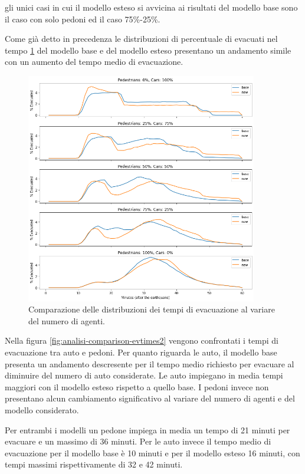 gli unici casi in cui il modello esteso si avvicina ai risultati del modello base sono il caso con solo pedoni ed il caso 75\%-25\%.

\pagebreak

Come già detto in precedenza le distribuzioni di percentuale di evacuati nel tempo \ref{fig:analisi-comparison-evtimes} del modello base e del modello esteso 
presentano un andamento simile con un aumento del tempo medio di evacuazione.

\begin{figure}[h]
    \centering
    \includegraphics[width=0.9\textwidth]{images/analisi/comparison-evtimes.png}
    \caption{Comparazione delle distribuzioni dei tempi di evacuazione al variare del numero di agenti.}
    \label{fig:analisi-comparison-evtimes}
\end{figure}


Nella figura \ref{fig:analisi-comparison-evtimes2} vengono confrontati i tempi di evacuazione tra auto e pedoni.
Per quanto riguarda le auto, il modello base presenta un andamento descresente per il tempo medio richiesto per evacuare al diminuire del numero di auto considerate.
Le auto impiegano in media tempi maggiori con il modello esteso rispetto a quello base.
%
I pedoni invece non presentano alcun cambiamento significativo al variare del numero di agenti e del modello considerato. 

Per entrambi i modelli un pedone impiega in media un tempo di 21 minuti per evacuare e un massimo di 36 minuti.
Per le auto invece il tempo medio di evacuazione per il modello base è 10 minuti e per il modello esteso 16 minuti, 
con tempi massimi rispettivamente di 32 e 42 minuti.

